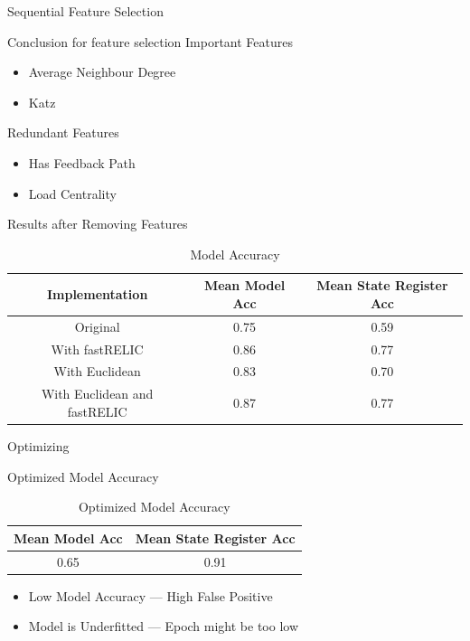 \documentclass[aspectratio=169]{beamer}
\begin{document}
\begin{frame}{Sequential Feature Selection}
\centering
\resizebox{!}{0.7\paperheight}{
	
	\label{fig:Feature Occurrence Percentage: SFS}
}
\end{frame}

\begin{frame}{Conclusion for feature selection}
Important Features
	\begin{itemize}
		\item Average Neighbour Degree
		\item Katz
	\end{itemize}
Redundant Features
\begin{itemize}
	\item Has Feedback Path
	\item Load Centrality
\end{itemize}
\end{frame}


\begin{frame}{Results after Removing Features}
\centering
\begin{table}
	\begin{tabular}{|c|c|c|}
		\hline
		Implementation & Mean Model Acc & Mean State Register Acc\\
		\hline
	  	\hline
		Original & 0.75 & 0.59\\
		\hline
		With fastRELIC & 0.86 & 0.77\\
		\hline
		With Euclidean & 0.83 & 0.70\\
		\hline
		With Euclidean and fastRELIC & 0.87 & 0.77\\
  		\hline
	\end{tabular}
	\caption{Model Accuracy}
	\label{tab:Accuracy after feature selection}
\end{table}
\end{frame}

\begin{frame}[c]{ }
\begin{center}
	\Huge Optimizing
\end{center}
\end{frame}

\begin{frame}{Optimized Model Accuracy}
\centering
\begin{table}
	\begin{tabular}{|c|c|}
		\hline
		Mean Model Acc & Mean State Register Acc\\
		\hline
	  	\hline
		0.65 & 0.91\\
  		\hline
	\end{tabular}
	\caption{Optimized Model Accuracy}
	\label{tab:Optimized Model Accuracy}
\end{table}
\begin{itemize}
	\item Low Model Accuracy --- High False Positive
	\item Model is Underfitted --- Epoch might be too low
\end{itemize}
\end{frame}
\end{document}
